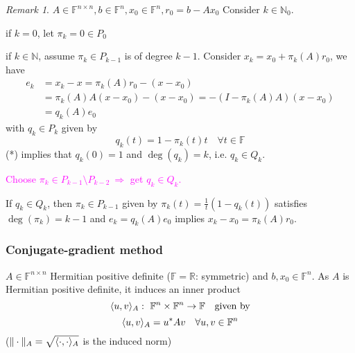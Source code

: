 \documentclass[12pt]{article}
\theoremstyle{definition}
\theoremstyle{remark}
\newtheorem{remark}[theorem]{Remark}
\numberwithin{equation}{section}
\newcommand{\F}{\mathbb{F}}
\newcommand{\R}{\mathbb{R}}
\newcommand{\N}{\mathbb{N}}
\newcommand{\normempty}{\|\cdot\|}
\DeclarePairedDelimiter{\iprod}{\langle}{\rangle}
\begin{document}
\begin{remark}
  \label{rem:7.3}
  $A \in \F^{n\times n}, b \in \F^n, x_0 \in \F^n, r_0 = b - Ax_0$ Consider $k \in \N_0$.

  if $k=0$, let $\pi_k = 0 \in P_0$

  if $k \in \N$, assume $\pi_k \in P_{k-1}$ is of degree $k-1$. Consider $x_k = x_0 + \pi_k(A) r_0$, we have
  \begin{align*}
    e_k &= x_k - x = \pi_k(A) r_0 - (x - x_0) \\
    &= \pi_k(A) A (x - x_0) - (x-x_0) = -(I-\pi_k(A) A)(x-x_0) \\
    &= q_k(A) e_0
  \end{align*}
  with $q_k \in P_k$ given by
  \begin{equation*}
    \tag{*}
    \boxed{q_k(t) = 1 - \pi_k(t)t} \quad \forall t \in \F
  \end{equation*}
  (*) implies that $q_k(0) = 1$ and $\deg(q_k) = k$, i.e. $q_k \in Q_k$.

  \textcolor{magenta}{
    Choose $\pi_k \in P_{k-1} \setminus P_{k-2}\ \Longrightarrow$ get $q_k \in Q_k$.
  }

  If $q_k \in Q_k$, then $\pi_k \in P_{k-1}$ given by $\pi_k(t) = \frac{1}{t}(1-q_k(t))$ satisfies $\deg(\pi_k) = k-1$ and $e_k = q_k(A)e_0$ implies $x_k - x_0 = \pi_k(A) r_0$.
\end{remark}
\subsubsection*{Conjugate-gradient method}
$A \in \F^{n\times n}$ Hermitian positive definite ($\F = \R$: symmetric) and $b, x_0 \in \F^n$. As $A$ is Hermitian positive definite, it induces an inner product
\begin{equation*}
  \iprod{u,v}_A:\ \F^n \times \F^n \rightarrow \F \quad \text{given by}
\end{equation*}
\begin{equation*}
  \iprod{u,v}_A = u^* A v \quad \forall u, v \in \F^n
\end{equation*}
($\normempty_A= \sqrt{\iprod{\cdot,\cdot}_A}$ is the induced norm)
\end{document}
